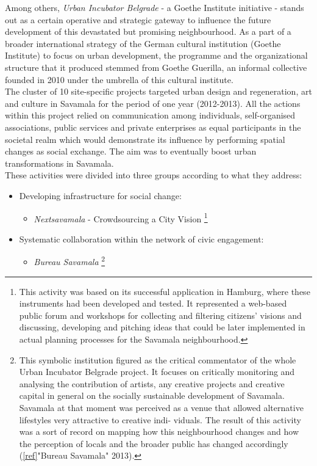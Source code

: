 \documentclass[11pt]{report}
\begin{document}
{{{{Among others, \textit{Urban Incubator Belgrade} - a Goethe Institute initiative - stands out as a certain operative and strategic gateway to influence the future development of this devastated but promising neighbourhood.
As a part of a broader international strategy of the German cultural institution (Goethe Institute) to focus on urban development, the programme and the organizational structure that it produced stemmed from Goethe Guerilla, an informal collective founded in 2010 under the umbrella of this cultural institute.
\\

The cluster of 10 site-specific projects targeted urban design and regeneration, art and culture in Savamala for the period of one year (2012-2013). All the actions within this project relied on communication among individuals, self-organised associations, public services and private enterprises as equal participants in the societal realm which would demonstrate its influence by performing spatial changes as social exchange. The aim was to eventually boost urban transformations in Savamala.
\\
These activities were divided into three groups according to what they address:
\begin{itemize}
\item Developing infrastructure for social change:

\begin{itemize}
\item \textit{Nextsavamala} - Crowdsourcing a City Vision
\footnote{This activity was based on its successful application in Hamburg, where these instruments had been developed and tested. It represented a web-based public forum and workshops for collecting and filtering citizens’ visions and discussing, developing and pitching ideas that could be later  implemented in actual planning processes for the Savamala neighbourhood.}
\end{itemize}

\item Systematic collaboration within the network of civic engagement:

\begin{itemize}
\item \textit{Bureau Savamala}
\footnote{This symbolic institution figured as the critical commentator of the whole Urban Incubator Belgrade project. It focuses on critically monitoring and analysing the contribution of artists, any creative projects and creative capital in general on the socially sustainable development of Savamala. Savamala at that moment was perceived as a venue that allowed alternative lifestyles very attractive to creative indi- viduals. The result of this activity was a sort of record on mapping how this neighbourhood changes and how the perception of locals and the broader public has changed accordingly (\ref{ref}{"Bureau Savamala" 2013}).}


\end{itemize}
\end{itemize}}}}}
\end{document}
